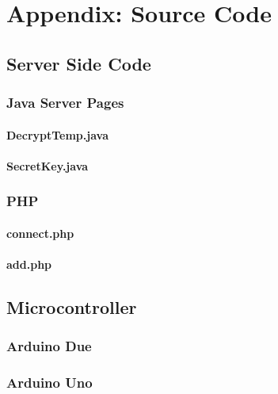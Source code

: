 
\chapter{Appendix: Source Code} %

\label{AppendixA} %

\section{Server Side Code}

\subsection{Java Server Pages}

\subsubsection{DecryptTemp.java}



\subsubsection{SecretKey.java}



\subsection{PHP}

\subsubsection{connect.php}




\subsubsection{add.php}




\section{Microcontroller}

\subsection{Arduino Due}



\subsection{Arduino Uno}


